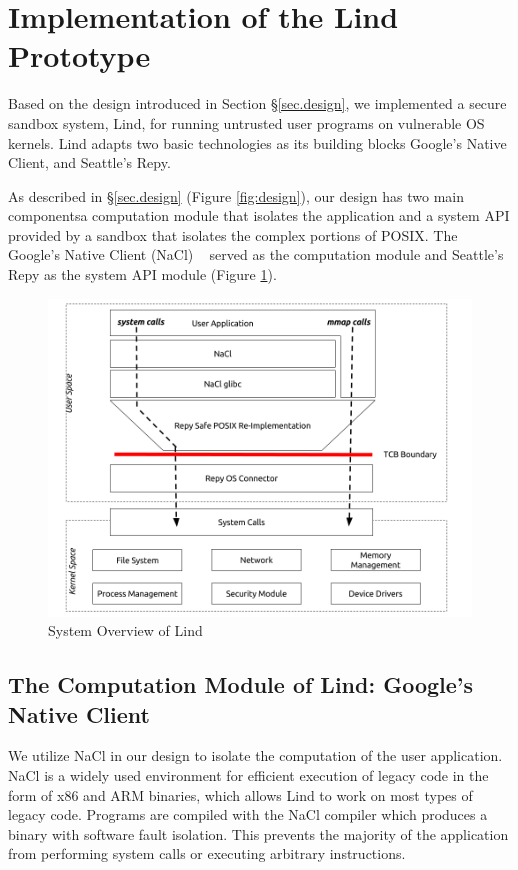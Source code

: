 \section{Implementation of the Lind Prototype}
\label{sec.implementation}

Based on the design introduced in Section \S{\ref{sec.design}}, 
we implemented a secure sandbox system, Lind, 
for running untrusted user programs on vulnerable OS kernels. 
Lind adapts two basic technologies as its building blocks\textendash 
Google's Native Client, and Seattle's Repy. 

As described in \S{\ref{sec.design}} (Figure \ref{fig:design}), our design has
two main components\textendash a computation module that isolates the 
application and a system API provided by a sandbox that isolates the complex 
portions of POSIX.
The Google's Native Client (NaCl) ~\cite{NaCl-09} served as the computation 
module 
and Seattle's Repy as the system API module (Figure \ref{fig:architecture}).

\begin{figure}%
\centering
\includegraphics[width=1.0\columnwidth]{diagram/fig4.png}
\caption{System Overview of Lind}
\label{fig:architecture}
\end{figure}

\subsection{The Computation Module of Lind: Google's Native Client}

We utilize NaCl in our design to isolate the computation of the user application.  NaCl is a widely used environment for efficient  execution of legacy code in the form of x86 and ARM binaries, which allows Lind to work on most types of legacy code. Programs are compiled with the NaCl compiler which produces a binary with software fault isolation. This prevents the majority of the application from performing system calls  or executing arbitrary instructions. 

